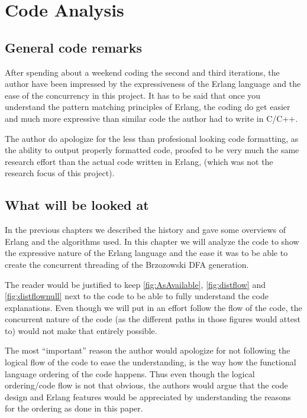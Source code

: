 \chapter{Code Analysis}

\section{General code remarks}


After spending about a weekend coding the second and third iterations,
the author have been impressed by the expressiveness of the Erlang
language and the ease of the concurrency in this project. It has to be
said that once you understand the pattern matching principles of
Erlang, the coding do get easier and much more expressive than similar
code the author had to write in C/C++.

The author do apologize for the less than profesional looking code
formatting, as the ability to output properly formatted code, proofed
to be very much the same research effort than the actual code written in Erlang,
(which was not the research focus of this project).

\section{What will be looked at}

In the previous chapters we described the history and gave some
overviews of Erlang and the algorithms used.  In this chapter we will
analyze the code to show the expressive nature of the Erlang language
and the ease it was to be able to create the concurrent threading of
the Brzozowski DFA generation.

The reader would be justified to keep \autoref{fig:AsAvailable},
\autoref{fig:distflow} and \autoref{fig:distflownull} next to the code
to be able to fully understand the code explanations. Even though we
will put in an effort follow the flow of the code, the concurrent
nature of the code (as the different paths in those figures would
attest to) would not make that entirely possible.

The most ``important'' reason the author would apologize for not
following the logical flow of the code to ease the understanding, is
the way how the functional language ordering of the code happens. Thus
even though the logical ordering/code flow is not that obvious, the
authors would argue that the code design and Erlang features would be
appreciated by understanding the reasons for the ordering as done in
this paper.

